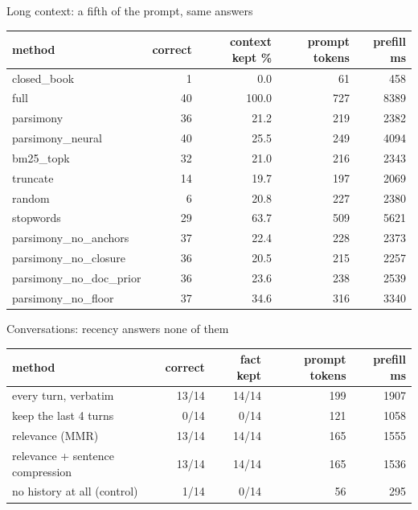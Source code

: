 \documentclass[aspectratio=169]{beamer}
\begin{document}
\begin{frame}{Long context: a fifth of the prompt, same answers}
  \begin{center}
  \begin{tabular}{lrrrr}
    \toprule
    \textbf{method} & \textbf{correct} & \textbf{context kept \%} & \textbf{prompt tokens} & \textbf{prefill ms} \\
    \midrule
      closed\_book & 1 & 0.0 & 61 & 458 \\
      full & 40 & 100.0 & 727 & 8389 \\
      parsimony & 36 & 21.2 & 219 & 2382 \\
      parsimony\_neural & 40 & 25.5 & 249 & 4094 \\
      bm25\_topk & 32 & 21.0 & 216 & 2343 \\
      truncate & 14 & 19.7 & 197 & 2069 \\
      random & 6 & 20.8 & 227 & 2380 \\
      stopwords & 29 & 63.7 & 509 & 5621 \\
      parsimony\_no\_anchors & 37 & 22.4 & 228 & 2373 \\
      parsimony\_no\_closure & 36 & 20.5 & 215 & 2257 \\
      parsimony\_no\_doc\_prior & 36 & 23.6 & 238 & 2539 \\
      parsimony\_no\_floor & 37 & 34.6 & 316 & 3340 \\
    \bottomrule
  \end{tabular}
  \end{center}
\end{frame}

\begin{frame}{Conversations: recency answers none of them}
  \begin{center}
  \begin{tabular}{lrrrr}
    \toprule
    \textbf{method} & \textbf{correct} & \textbf{fact kept} & \textbf{prompt tokens} & \textbf{prefill ms} \\
    \midrule
      every turn, verbatim & 13/14 & 14/14 & 199 & 1907 \\
      keep the last 4 turns & 0/14 & 0/14 & 121 & 1058 \\
      relevance (MMR) & 13/14 & 14/14 & 165 & 1555 \\
      relevance + sentence compression & 13/14 & 14/14 & 165 & 1536 \\
      no history at all (control) & 1/14 & 0/14 & 56 & 295 \\
    \bottomrule
  \end{tabular}
  \end{center}
\end{frame}
\end{document}
